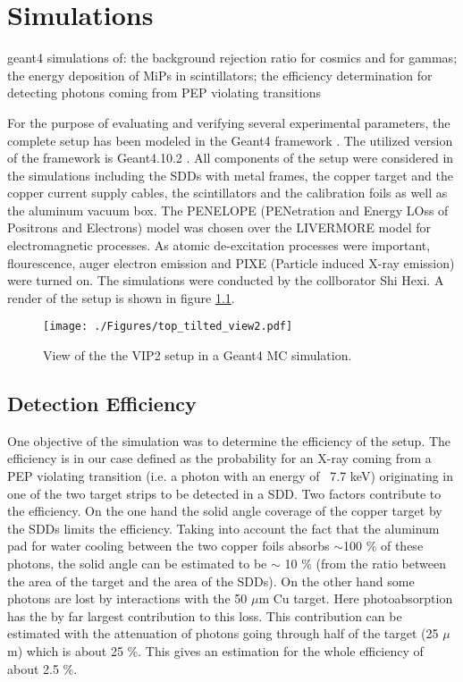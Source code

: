\chapter{Simulations}
\label{chap:Simulation}

geant4 simulations of: the background rejection ratio for cosmics and for gammas; the energy deposition of MiPs in scintillators; the efficiency determination for detecting photons coming from PEP violating transitions

For the purpose of evaluating and verifying several experimental parameters, the complete setup has been modeled in the Geant4 framework \cite{Agostinelli2003}. The utilized version of the framework is     Geant4.10.2 . All components of the setup were considered in the simulations including the SDDs with metal frames, the copper target and the copper current supply cables, the scintillators and the calibration foils as well as the aluminum vacuum box. The PENELOPE (PENetration and Energy LOss of Positrons and Electrons) model was chosen over the LIVERMORE model for electromagnetic processes. As atomic de-excitation processes were important, flourescence, auger electron emission and PIXE (Particle induced X-ray emission) were turned on. The simulations were conducted by the collborator Shi Hexi. A render of the setup is shown in figure \ref{fig:mc_setup}.
\begin{figure}[h]
 \centering
 \texttt{[image: ./Figures/top\_tilted\_view2.pdf]}
 \caption{View of the the VIP2 setup in a Geant4 MC simulation.}
 \label{fig:mc_setup}
\end{figure}

\section{Detection Efficiency}

One objective of the simulation was to determine the efficiency of the setup. The efficiency is in our case defined as the probability for an X-ray coming from a PEP violating transition (i.e. a photon with an energy of ~7.7 keV) originating in one of the two target strips to be detected in a SDD. Two factors contribute to the efficiency. On the one hand the solid angle coverage of the copper target by the SDDs limits the efficiency. Taking into account the fact that the aluminum pad for water cooling between the two copper foils absorbs $\sim$100 \% of these photons, the solid angle can be estimated to be $\sim$ 10 \% (from the ratio between the area of the target and the area of the SDDs). On the other hand some photons are lost by interactions with the 50 $\mu$m Cu target. Here photoabsorption has the by far largest contribution to this loss. This contribution can be estimated with the attenuation of photons going through half of the target (25 $\mu$m) which is about 25 \%. This gives an estimation for the whole efficiency of about 2.5 \%.

